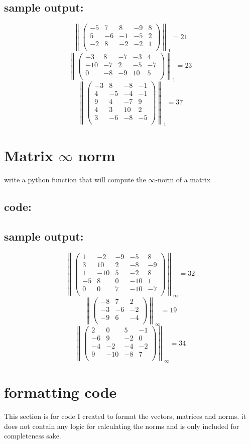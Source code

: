 \documentclass{article}
\begin{document}
	\subsection*{sample output:}
	$$ \left\| \begin{pmatrix}-5 & 7 & 8 & -9 & 8 \\5 & -6 & -1 & -5 & 2 \\-2 & 8 & -2 & -2 & 1 \\\end{pmatrix}\right\|_{1} = 21$$
	$$ \left\| \begin{pmatrix}-3 & 8 & -7 & -3 & 4 \\-10 & -7 & 2 & -5 & -7 \\0 & -8 & -9 & 10 & 5 \\\end{pmatrix}\right\|_{1} = 23$$
	$$ \left\| \begin{pmatrix}-3 & 8 & -8 & -1 \\4 & -5 & -4 & -1 \\9 & 4 & -7 & 9 \\4 & 3 & 10 & 2 \\3 & -6 & -8 & -5 \\\end{pmatrix}\right\|_{1} = 37$$
	
\section{Matrix $\infty$ norm}
	write a python function that will compute the $\infty$-norm of a matrix
	\subsection*{code:}
	
	\subsection*{sample output:}
	$$ \left\| \begin{pmatrix}1 & -2 & -9 & -5 & 8 \\3 & 10 & 2 & -8 & -9 \\1 & -10 & 5 & -2 & 8 \\-5 & 8 & 0 & -10 & 1 \\0 & 0 & 7 & -10 & -7 \\\end{pmatrix}\right\|_{\infty} = 32$$
	$$ \left\| \begin{pmatrix}-8 & 7 & 2 \\-3 & -6 & -2 \\-9 & 6 & -4 \\\end{pmatrix}\right\|_{\infty} = 19$$
	$$ \left\| \begin{pmatrix}2 & 0 & 5 & -1 \\-6 & 9 & -2 & 0 \\-4 & -2 & -4 & -2 \\9 & -10 & -8 & 7 \\\end{pmatrix}\right\|_{\infty} = 34$$

\pagebreak
\section{formatting code}
	This section is for code I created to format the vectors, matrices and norms.
	it does not contain any logic for calculating the norms and is only included for completeness sake.
	
\end{document}
